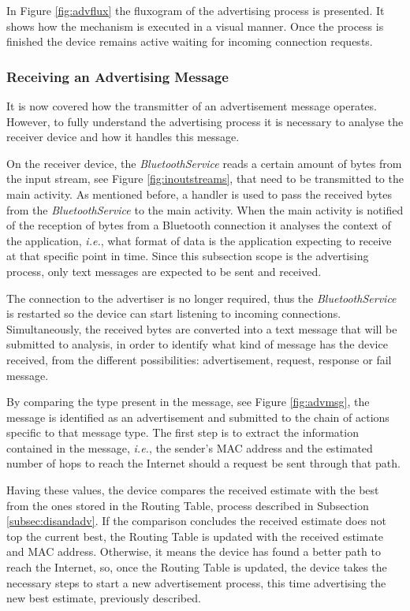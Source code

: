 In Figure \ref{fig:advflux} the fluxogram of the advertising process is presented. It shows how the mechanism is executed in a visual manner. Once the process is finished the device remains active waiting for incoming connection requests.

\subsubsection{Receiving an Advertising Message}
\label{subsubsec:rcvadv}

It is now covered how the transmitter of an advertisement message operates. However, to fully understand the advertising process it is necessary to analyse the receiver device and how it handles this message. 

On the receiver device, the \textit{BluetoothService} reads a certain amount of bytes from the input stream, see Figure \ref{fig:inoutstreams}, that need to be transmitted to the main activity. As mentioned before, a handler is used to pass the received bytes from the \textit{BluetoothService} to the main activity. When the main activity is notified of the reception of bytes from a Bluetooth connection it analyses the context of the application, \textit{i.e.}, what format of data is the application expecting to receive at that specific point in time. Since this subsection scope is the advertising process, only text messages are expected to be sent and received.

The connection to the advertiser is no longer required, thus the \textit{BluetoothService} is restarted so the device can start listening to incoming connections. Simultaneously, the received bytes are converted into a text message that will be submitted to analysis, in order to identify what kind of message has the device received, from the different possibilities: advertisement, request, response or fail message.

By comparing the type present in the message, see Figure \ref{fig:advmsg}, the message is identified as an advertisement and submitted to the chain of actions specific to that message type. The first step is to extract the information contained in the message, \textit{i.e.}, the sender's \gls{MAC} address and the estimated number of hops to reach the Internet should a request be sent through that path.

Having these values, the device compares the received estimate with the best from the ones stored in the Routing Table, process described in Subsection \ref{subsec:disandadv}. If the comparison concludes the received estimate does not top the current best, the Routing Table is updated with the received estimate and \gls{MAC} address. Otherwise, it means the device has found a better path to reach the Internet, so, once the Routing Table is updated, the device takes the necessary steps to start a new advertisement process, this time advertising the new best estimate, previously described. 

